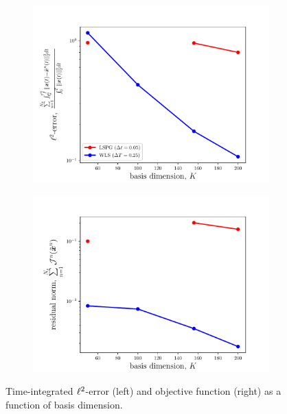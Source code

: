 \begin{figure}
\begin{center}
\begin{subfigure}[t]{0.45\textwidth}
\includegraphics[trim={0cm 0cm 0cm 0cm},clip,width=1.\linewidth]{figs/cavity_new/error_vs_basisSize.pdf}
\end{subfigure}
\begin{subfigure}[t]{0.45\textwidth}
\includegraphics[trim={0cm 0cm 0cm 0cm},clip,width=1.\linewidth]{figs/cavity_new/residual_vs_basisSize.pdf}
\end{subfigure}
\end{center}
\caption{Time-integrated $\ell^2$-error (left) and objective function (right) as a function of basis dimension.}
\label{fig:cav_results_basisdim}
\end{figure}


